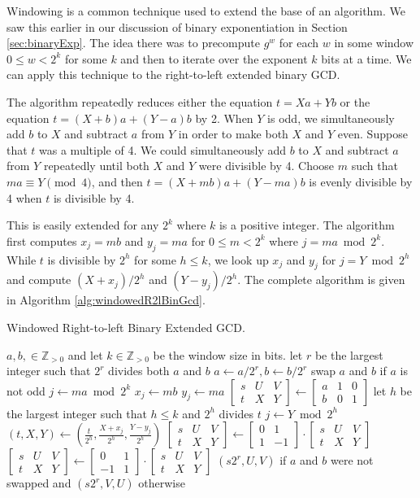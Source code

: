 \documentclass{ucalgthes1}
\theoremstyle{definition}
\newcommand{\ZZgtz}{\mathbb{Z}_{>0}}
\newcommand{\matrixtt}[4]{\left[ \begin{array}{rr} #1 & #2 \\ #3 & #4 \end{array} \right]}
\newcommand{\matrixThreeTwo}[6]{\left[ \begin{array}{rrr} #1 & #2 & #3 \\ #4 & #5 & #6 \end{array} \right]}
\begin{document}

Windowing is a common technique used to extend the base of an algorithm.  We saw this earlier in our discussion of binary exponentiation in Section \ref{sec:binaryExp}.  The idea there was to precompute $g^w$ for each $w$ in some window $0 \le w < 2^k$ for some $k$ and then to iterate over the exponent $k$ bits at a time.  We can apply this technique to the right-to-left extended binary GCD.

The algorithm repeatedly reduces either the equation $t=Xa+Yb$ or the equation $t=(X+b)a+(Y-a)b$ by 2. When $Y$ is odd, we simultaneously add $b$ to $X$ and subtract $a$ from $Y$ in order to make both $X$ and $Y$ even.  Suppose that $t$ was a multiple of 4.  We could simultaneously add $b$ to $X$ and subtract $a$ from $Y$ repeatedly until both $X$ and $Y$ were divisible by 4.  Choose $m$ such that $ma \equiv Y \pmod 4$, and then $t = (X+mb)a + (Y-ma)b$ is evenly divisible by 4 when $t$ is divisible by 4.

This is easily extended for any $2^k$ where $k$ is a positive integer.  The algorithm first computes $x_j = mb$ and $y_j = ma$ for $0 \le m < 2^k$ where $j = ma \bmod 2^k$.  While $t$ is divisible by $2^h$ for some $h \le k$, we look up $x_j$ and $y_j$ for $j = Y \bmod 2^h$ and compute $(X + x_j) / 2^h$ and $(Y - y_j) / 2^h$.  The complete algorithm is given in Algorithm \ref{alg:windowedR2lBinGcd}.

\begin{algorithm}[htb]
\caption{Windowed Right-to-left Binary Extended GCD.}
\label{alg:windowedR2lBinGcd}
\begin{algorithmic}[1]
\Require $a,b, \in \ZZgtz$ and let $k \in \ZZgtz$ be the window size in bits.
\State let $r$ be the largest integer such that $2^r$ divides both $a$ and $b$
\State $a \gets a / 2^r, b \gets b / 2^r$
\State swap $a$ and $b$ if $a$ is not odd
	\State $j \gets ma \bmod 2^k$
	\State $x_j \gets mb$
	\State $y_j \gets ma$
\EndFor
\State $\matrixThreeTwo{s}{U}{V}{t}{X}{Y} \gets \matrixThreeTwo{a}{1}{0}{b}{0}{1}$
		\State let $h$ be the largest integer such that $h \le k$ and $2^h$ divides $t$
		\State $j \gets Y \bmod 2^h$
		\State $(t, X, Y) \gets \left( \frac{t}{2^h}, \frac{X+x_j}{2^h}, \frac{Y-y_j}{2^h} \right)$  
	\EndWhile
		\State $\matrixThreeTwo{s}{U}{V}{t}{X}{Y} \gets \matrixtt{0}{1}{1}{-1} \cdot \matrixThreeTwo{s}{U}{V}{t}{X}{Y}$
	\Else
		\State $\matrixThreeTwo{s}{U}{V}{t}{X}{Y} \gets \matrixtt{0}{1}{-1}{1} \cdot \matrixThreeTwo{s}{U}{V}{t}{X}{Y}$
	\EndIf
\EndWhile
\State \Return $(s2^r, U, V)$ if $a$ and $b$ were not swapped and $(s2^r, V, U)$ otherwise
\end{algorithmic}
\end{algorithm}
\end{document}
